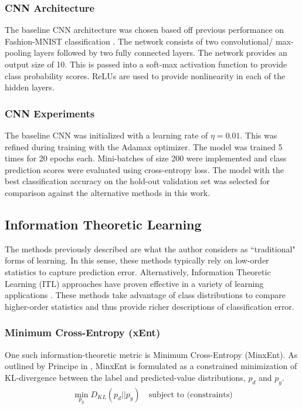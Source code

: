 \documentclass[conference]{IEEEtran}
\begin{document}
	 \subsubsection*{CNN Architecture}
	 The baseline CNN architecture was chosen based off previous performance on Fashion-MNIST classification \cite{Xiao2017FashionMNIST}.  The network consists of two convolutional/ max-pooling layers followed by two fully connected layers.  The network provides an output size of 10.  This is passed into a soft-max activation function to provide class probability scores.  ReLUs are used to provide nonlinearity in each of the hidden layers. 
	 
	 \subsubsection*{CNN Experiments}
	 The baseline CNN was initialized with a learning rate of $\eta=0.01$.  This was refined during training with the Adamax optimizer.  The model was trained 5 times for 20 epochs each.  Mini-batches of size 200 were implemented and class prediction scores were evaluated using cross-entropy loss.  The model with the best classification accuracy on the hold-out validation set was selected for comparison against the alternative methods in this work.  
	 
	 
	 
	 \subsection{Information Theoretic Learning}
	 The methods previously described are what the author considers as ``traditional" forms of learning.  In this sense, these methods typically rely on low-order statistics to capture prediction error.  Alternatively, Information Theoretic Learning (ITL) approaches have proven effective in a variety of learning applications \cite{Principe2010ITL}.  These methods take advantage of class distributions to compare higher-order statistics and thus provide richer  descriptions of classification error.
	 
	 \subsubsection*{Minimum Cross-Entropy (xEnt)}
	 One such information-theoretic metric is Minimum Cross-Entropy (MinxEnt).  As outlined by Principe in \cite{Principe2010ITL}, MinxEnt is formulated as a constrained minimization of KL-divergence between the label and predicted-value distributions, $p_d$ and $p_y$. 
	 \begin{align}
	 	\min_{p_y}D_{KL}(p_d||p_y) \quad \text{subject to (constraints)}
	 \end{align} 
	 
\end{document}

